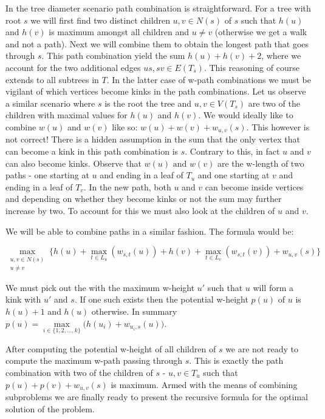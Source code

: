 In the tree diameter scenario path combination is straightforward. For a tree with root $s$ we will first find two distinct children $u, v \in N(s)$ of $s$ such that $h(u)$ and $h(v)$ is maximum amongst all children and $u \ne v$ (otherwise we get a walk and not a path). Next we will combine them to obtain the longest path that goes through $s$. This path combination yield the sum $h(u) + h(v) + 2$, where we account for the two additional edges $us, sv \in E(T_s)$. This reasoning of course extends to all subtrees in $T$. In the latter case of w-path combinations we must be vigilant of which vertices become kinks in the path combinations. Let us observe a similar scenario where $s$ is the root the tree and $u, v \in V(T_s)$ are two of the children with maximal values for $h(u)$ and $h(v)$. We would ideally like to combine $w(u)$ and $w(v)$ like so: $w(u) + w(v) + w_{u, v}(s)$. This however is not correct! There is a hidden assumption in the sum that the only vertex that can become a kink in this path combination is $s$. Contrary to this, in fact $u$ and $v$ can also become kinks. Observe that $w(u) \text{ and } w(v)$ are the w-length of two paths - one starting at $u$ and ending in a leaf of $T_u$ and one starting at $v$ and ending in a leaf of $T_v$. In the new path, both $u$ and $v$ can become inside vertices and depending on whether they become kinks or not the sum may further increase by two. To account for this we must also look at the children of $u$ and $v$. 

We will be able to combine paths in a similar fashion. The formula would be:

$$\max\limits_{\substack{u, v \in N(s) \\ u \ne v}}\{ h(u) + \max\limits_{t \in L_u}(w_{s, t}(u)) + h(v) + \max\limits_{t \in L_v}(w_{s, t}(v)) + w_{u, v}(s)\}$$

We must pick out the with the maximum w-height $u'$ such that $u$ will form a kink with $u'$ and $s$. If one such exists then the potential w-height $p(u)$ of $u$ is $h(u) + 1$ and $h(u)$ otherwise. In summary $p(u) = \max\limits_{i \in \{1, 2, ..., k\}}\big(h(u_i) + w_{u_i, s}(u)\big)$.

After computing the potential w-height of all children of $s$ we are not ready to compute the maximum w-path passing through $s$. This is exactly the path combination with two of the children of $s$ - $u, v \in T_u$ such that $p(u) + p(v) + w_{u, v}(s)$ is maximum. Armed with the means of combining subproblems we are finally ready to present the recursive formula for the optimal solution of the problem.



